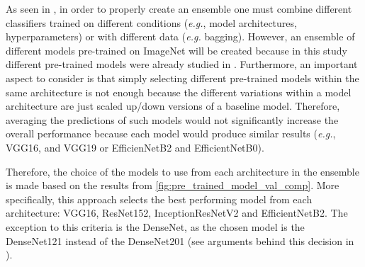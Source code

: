     As seen in , in order to properly create an ensemble one must combine different classifiers trained on different conditions (\textit{e.g.}, model architectures, hyperparameters) or with different data (\textit{e.g.} bagging). However, an ensemble of different models pre-trained on ImageNet will be created because in this study different pre-trained models were already studied in . Furthermore, an important aspect to consider is that simply selecting different pre-trained models within the same architecture is not enough because the different variations within a model architecture are just scaled up/down versions of a baseline model. Therefore, averaging the predictions of such models would not significantly increase the overall performance because each model would produce similar results (\textit{e.g.}, VGG16, and VGG19 or EfficienNetB2 and EfficientNetB0). 
    
    Therefore, the choice of the models to use from each architecture in the ensemble is made based on the results from \autoref{fig:pre_trained_model_val_comp}. More specifically, this approach selects the best performing model from each architecture: VGG16, ResNet152, InceptionResNetV2 and EfficientNetB2. The exception to this criteria is the DenseNet, as the chosen model is the DenseNet121 instead of the DenseNet201 (see arguments behind this decision in ). \par
    
